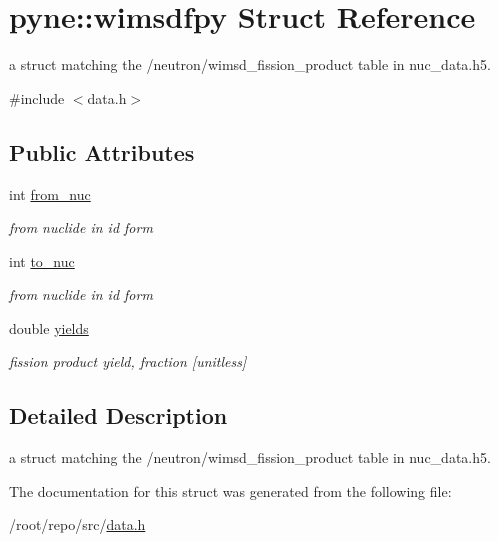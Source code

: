 \hypertarget{structpyne_1_1wimsdfpy}{}\section{pyne\+:\+:wimsdfpy Struct Reference}
\label{structpyne_1_1wimsdfpy}


a struct matching the \textquotesingle{}/neutron/wimsd\+\_\+fission\+\_\+product\textquotesingle{} table in nuc\+\_\+data.\+h5.  




{\ttfamily \#include $<$data.\+h$>$}

\subsection*{Public Attributes}
\begin{DoxyCompactItemize}
\item 
\mbox{\label{structpyne_1_1wimsdfpy_a7521e458719ebb8ed23f4912ec4555f8}} 
int \hyperlink{structpyne_1_1wimsdfpy_a7521e458719ebb8ed23f4912ec4555f8}{from\+\_\+nuc}
\begin{DoxyCompactList}\small\item\em from nuclide in id form \end{DoxyCompactList}\item 
\mbox{\label{structpyne_1_1wimsdfpy_a2a0f913a64fb76c5c82e1212df7fbb6c}} 
int \hyperlink{structpyne_1_1wimsdfpy_a2a0f913a64fb76c5c82e1212df7fbb6c}{to\+\_\+nuc}
\begin{DoxyCompactList}\small\item\em from nuclide in id form \end{DoxyCompactList}\item 
\mbox{\label{structpyne_1_1wimsdfpy_a1c20eef7a02f2f62dba113cbf24d8bf2}} 
double \hyperlink{structpyne_1_1wimsdfpy_a1c20eef7a02f2f62dba113cbf24d8bf2}{yields}
\begin{DoxyCompactList}\small\item\em fission product yield, fraction \mbox{[}unitless\mbox{]} \end{DoxyCompactList}\end{DoxyCompactItemize}


\subsection{Detailed Description}
a struct matching the \textquotesingle{}/neutron/wimsd\+\_\+fission\+\_\+product\textquotesingle{} table in nuc\+\_\+data.\+h5. 

The documentation for this struct was generated from the following file\+:\begin{DoxyCompactItemize}
\item 
/root/repo/src/\hyperlink{data_8h}{data.\+h}\end{DoxyCompactItemize}
